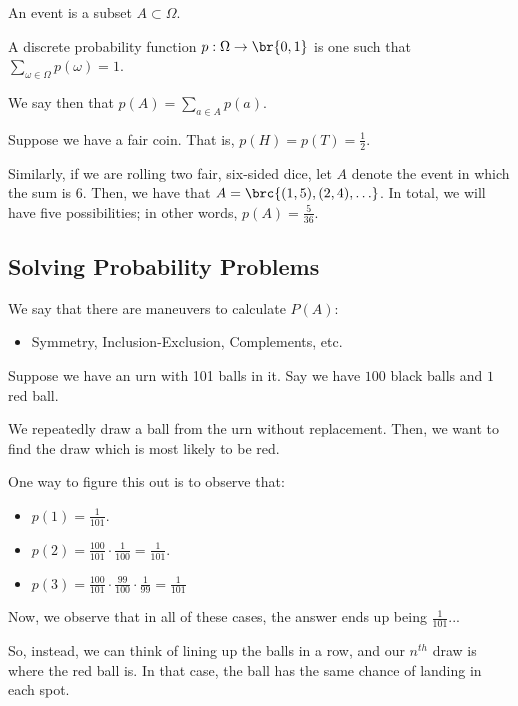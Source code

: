 \documentclass[openany]{book}
\begin{document}
\begin{defn}[Event]
	An event is a subset $A \subset \Omega$.
\end{defn}

\begin{defn}
	A discrete probability function $p : \Omega \rightarrow \br{0,1}$ is one such that $\sum_{\omega \in \Omega} p(\omega) = 1$.
\end{defn}

We say then that $p(A) = \sum_{a \in A} p(a)$.

\begin{example}
	Suppose we have a fair coin. That is, $p(H) = p(T) = \frac{1}{2}$.
	
	Similarly, if we are rolling two fair, six-sided dice, let $A$ denote the event in which the sum is $6$. Then, we have that $A = \brc{(1,5), (2,4), \ldots}$. In total, we will have five possibilities; in other words, $p(A) = \frac{5}{36}$.
\end{example}

\subsection{Solving Probability Problems}
We say that there are maneuvers to calculate $P(A)$:
\begin{itemize}
	\item Symmetry, Inclusion-Exclusion, Complements, etc.
\end{itemize}

\begin{example}[Symmetry]
	Suppose we have an urn with 101 balls in it. Say we have $100$ black balls and $1$ red ball.
	
	We repeatedly draw a ball from the urn without replacement. Then, we want to find the draw which is most likely to be red.
	
	One way to figure this out is to observe that:
	\begin{itemize}
		\item $p(1) = \frac{1}{101}$.
		\item $p(2) = \frac{100}{101} \cdot \frac{1}{100} = \frac{1}{101}$.
		\item $p(3) = \frac{100}{101} \cdot \frac{99}{100} \cdot \frac{1}{99} = \frac{1}{101}$
	\end{itemize}
	
	Now, we observe that in all of these cases, the answer ends up being $\frac{1}{101}$...
	
	So, instead, we can think of lining up the balls in a row, and our $n^{th}$ draw is where the red ball is. In that case, the ball has the same chance of landing in each spot.
\end{example}
\end{document}
